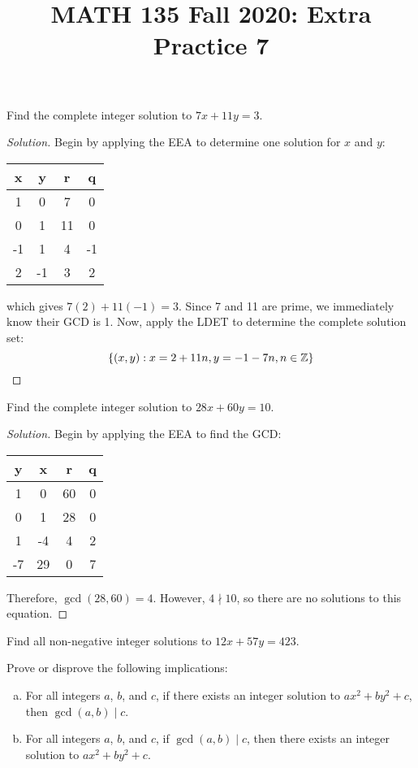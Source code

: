 
\title{MATH 135 Fall 2020: Extra Practice 7}


\thispagestyle{firstpage}

\textbf{\@title}


\question Find the complete integer solution to $7x+11y=3$.
\begin{proof}[Solution]
  Begin by applying the EEA to determine one solution for $x$ and $y$:
  \begin{center}
    \begin{tabular}{C|C|C|C}
      x  & y  & r  & q  \\   & 0  & 7  & 0  \\
      0  & 1  & 11 & 0  \\
      -1 & 1  & 4  & -1 \\
      2  & -1 & 3  & 2
    \end{tabular}
  \end{center}
  which gives $7(2)+11(-1)=3$.
  Since 7 and 11 are prime, we immediately know their GCD is 1.
  Now, apply the LDET to determine the complete solution set:
  \begin{equation*}
    \{ (x,y) : x = 2 + 11n, y = -1 -7n, n\in\mathbb{Z} \} \qedhere
  \end{equation*}
\end{proof}


\question Find the complete integer solution to $28x+60y=10$.
\begin{proof}[Solution]
  Begin by applying the EEA to find the GCD\@:
  \begin{center}
    \begin{tabular}{C|C|C|C}
      y  & x  & r  & q \\   & 0  & 60 & 0 \\
      0  & 1  & 28 & 0 \\
      1  & -4 & 4  & 2 \\
      -7 & 29 & 0  & 7
    \end{tabular}
  \end{center}
  Therefore, $\gcd(28,60)=4$.
  However, $4 \nmid 10$, so there are no solutions to this equation.
\end{proof}



\question Find all non-negative integer solutions to $12x+57y=423$.


\question Prove or disprove the following implications:
\begin{enumerate}[(a)]
  \item For all integers $a$, $b$, and $c$, if there exists an integer solution to $ax^2+by^2+c$,
        then $\gcd(a,b) \mid c$.
  \item For all integers $a$, $b$, and $c$, if $\gcd(a,b) \mid c$,
        then there exists an integer solution to $ax^2+by^2+c$.
\end{enumerate}


